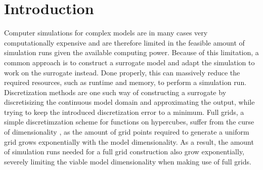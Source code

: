 \documentclass[
  a4paper,  %
  twoside,  %
  bibliography=totoc,
  headsepline,
  cleardoublepage=empty,
  parskip=half,
  draft=false
]{scrbook}
\begin{document}
\renewcommand*{\chapterpagestyle}{scrplain}
\pagestyle{scrheadings}
\pagestyle{scrheadings}
\ihead[]{}
\chead[]{}
\ohead[]{\headmark}
\cfoot[]{}
\ifoot[]{}

































%
%


\chapter{Introduction}
\label{chap:c1}

\setcounter{page}{1}

Computer simulations for complex models are in many cases very computationally expensive and are therefore limited in the feasible amount of simulation runs given the available computing power.
Because of this limitation, a common approach is to construct a surrogate model and adapt the simulation to work on the surrogate instead.
Done properly, this can massively reduce the required resources, such as runtime and memory, to perform a simulation run.
Discretization methods \cite{Stetter1973} are one such way of constructing a surrogate by discretisizing the continuous model domain and approximating the output, while trying to keep the introduced discretization error to a minimum.
Full grids, a simple discretimzation scheme for functions on hypercubes, suffer from the curse of dimensionality \cite{Bellman1961}, as the amount of grid points required to generate a uniform grid grows exponentially with the model dimensionality.
As a result, the amount of simulation runs needed for a full grid construction also grow exponentially, severely limiting the viable model dimensionality when making use of full grids.
\end{document}

